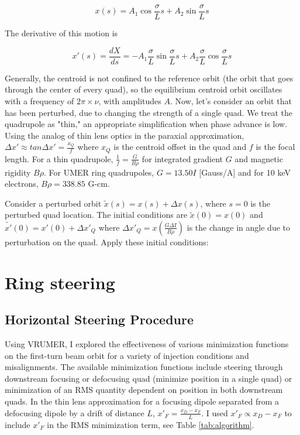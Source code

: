 \begin{equation} x(s) = A_1\cos{\frac{\sigma}{L}s} + A_2\sin{\frac{\sigma}{L}s}\end{equation}

The derivative of this motion is

\begin{equation} x'(s) = \frac{dX}{ds} = -A_1\frac{\sigma}{L}\sin{\frac{\sigma}{L}s} + A_2\frac{\sigma}{L}\cos{\frac{\sigma}{L}s}\end{equation}

Generally, the centroid is not confined to the reference orbit (the orbit that goes through the center of every quad), so the equilibrium centroid orbit oscillates with a frequency of $2\pi \times \nu$, with amplitudes $A$. Now, let's consider an orbit that has been perturbed, due to changing the strength of a single quad. We treat the quadrupole as "thin," an appropriate simplification when phase advance is low. Using the analog of thin lens optics in the paraxial approximation, $\Delta x' \approx tan \Delta x' = \frac{x_Q}{f}$ where $x_Q$ is the centroid offset in the quad and $f$ is the focal length. For a thin quadrupole, $\frac{1}{f} = \frac{G}{B\rho}$ for integrated gradient $G$ and magnetic rigidity $B\rho$. For UMER ring quadrupoles, $G=13.50I$ [Gauss/A] and for 10 keV electrons, $B\rho = 338.85$ G-cm. 

Consider a perturbed orbit $\tilde{x}(s) = x(s) + \Delta x(s)$, where $s=0$ is the perturbed quad location. The initial conditions are $\tilde{x}(0) = x(0)$ and $\tilde{x'}(0) = x'(0) + \Delta x'_Q$ where $\Delta x'_Q = x(\frac{G \Delta I}{B\rho})$ is the change in angle due to perturbation on the quad. Apply these initial conditions:









\section{Ring steering} \label{sec:steering:ringsteering}




\subsection{Horizontal Steering Procedure}

Using VRUMER, I explored the effectiveness of various minimization functions on the first-turn beam orbit for a variety of injection conditions and misalignments. The available minimization functions include steering through downstream focusing or defocusing quad (minimize position in a single quad) or minimization of an RMS quantity dependent on position in both downstream quads. In the thin lens approximation for a focusing dipole separated from a defocusing dipole by a drift of distance $L$, $x'_F = \frac{x_D-x_F}{L}$. I used $x'_F \propto x_D-x_F$ to include $x'_F$ in the RMS minimization term, see Table \ref{tab:algorithm}.

